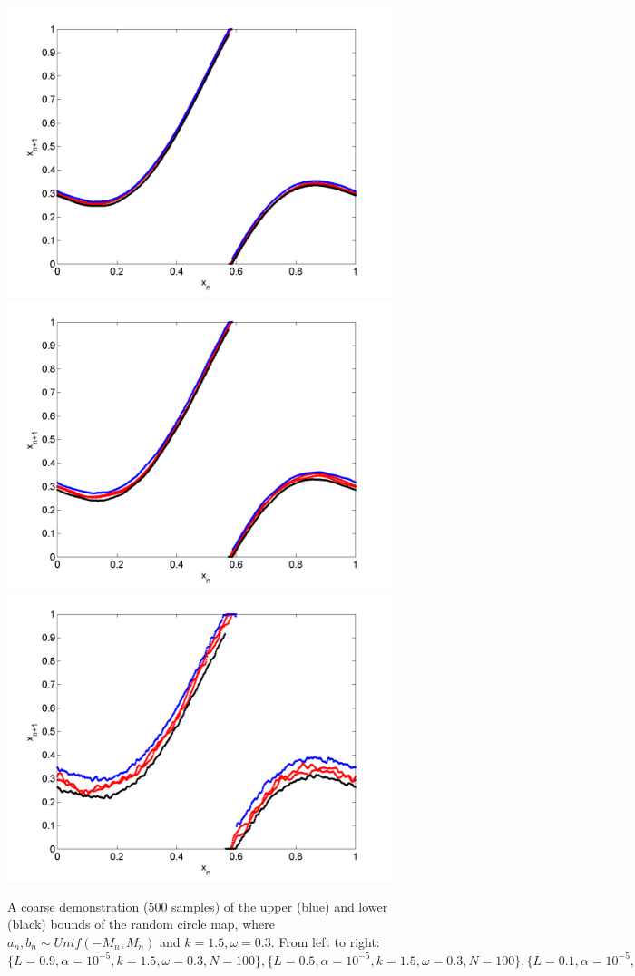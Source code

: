\begin{figure}[htp]
\caption[Upper and lower bounds on the random circle map, Uniform
distribution for $k=1.5,\omega=0.3$]{A coarse
  demonstration (500 samples) of the upper (blue) and lower (black)
  bounds of the random circle map, where $a_n,b_n\sim Unif(-M_n,M_n)$
  and $k=1.5,\omega=0.3$. From left to right:
  $\{L=0.9,\alpha = 10^{-5},k=1.5,\omega=0.3,N=100\}, \{L=0.5,\alpha = 10^{-5},k=1.5,\omega=0.3,N=100\},\{L=0.1,\alpha = 10^{-5},k=1.5,\omega=0.3,N=100\},$
  }\label{fig:circ_u_envelope2}
\centering
\includegraphics[width=.3\textwidth]{figs/envelope_unif_500_k15_L09_w03.png}\hfill
\includegraphics[width=.3\textwidth]{figs/envelope_unif_500_k15_L05_w03.png}\hfill
\includegraphics[width=.3\textwidth]{figs/envelope_unif_500_k15_L01_w03.png}
\end{figure}
